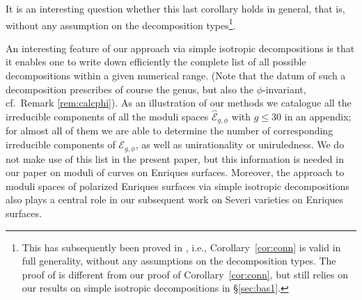 \documentclass[11pt]{amsart}
\theoremstyle{definition}
\def\E{{\mathcal E}}
\renewcommand{\leq}{\leqslant}
\begin{document}
 It is an interesting question whether this last corollary holds in general, that is, without any assumption on the decomposition types\footnote{This has subsequently been proved in  \cite[Thm.~4.2]{kn-JMPA},
   i.e.,
   Corollary~\ref{cor:conn} is valid in full generality, without any assumptions on
the decomposition types. \color{black} The proof of \cite[Thm.~4.2]{kn-JMPA} is different from our proof of Corollary~\ref{cor:conn}, but still relies on our results on simple isotropic decompositions in \S \ref{sec:bas1}.\color{black}}. 










An interesting feature of our approach via simple isotropic
decompositions is that it enables one to 
write down  efficiently  the complete list
of all possible decompositions within a given numerical range.   (Note that  the datum of such a decomposition
prescribes of course the genus, but also the $\phi$-invariant,
cf.\ Remark  \ref{rem:calcphi}).  As an
illustration of our  methods we  catalogue all the irreducible
components of all  the  moduli spaces
$\widehat\E _{g,\phi}$ with $g \leq 30$ in an appendix;
for almost all of them we are able to determine the number of
corresponding irreducible components of $\E _{g,\phi}$, as well as
unirationality or uniruledness.
We do not make use of this list in
the present paper, but this information is needed in \color{black} our
paper \color{black} \cite{cdgk-mod} on moduli of curves on Enriques
surfaces. \color{black} Moreover, the approach to moduli spaces of polarized Enriques surfaces via
simple isotropic decompositions \color{black} also plays \color{black} a central role in our \color{black} subsequent \color{black} work  \cite{cdgk-sev} on Severi varieties on Enriques surfaces. 
\end{document}
